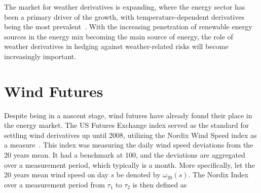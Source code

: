     The market for weather derivatives is expanding, where the energy sector has been a primary driver of the growth,
    with temperature-dependent derivatives being the most prevalent~\cite{ali_pricing_2023}.
    With the increasing penetration of renewable energy sources in the energy mix becoming the main source of energy,
    the role of weather derivatives in hedging against weather-related risks will become increasingly important.


%



\section{Wind Futures}
\label{sec:wind_futures}

    Despite being in a nascent stage, wind futures have already found their place in the energy market.
    The US Futures Exchange index served as the standard for settling wind derivatives up until 2008,
    utilizing the Nordix Wind Speed index as a measure~\cite{benth_dynamic_2009}.
    This index was measuring the daily wind speed deviations from the 20 years mean.
    It had a benchmark at 100, and the deviations are aggregated over a measurement period,
    which typically is a month.
    More specifically, let the 20 years mean wind speed on day $s$ be denoted by $\omega_{20}(s)$.
    The Nordix Index over a measurement period from $\tau_1$ to $\tau_2$ is then defined as

